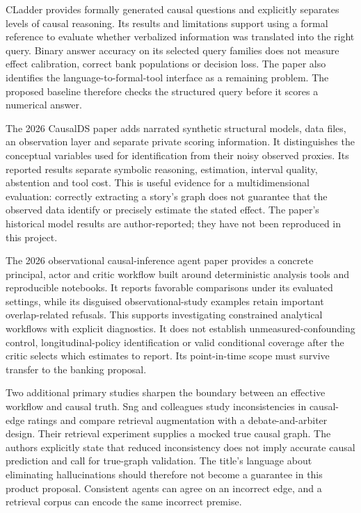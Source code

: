 CLadder provides formally generated causal questions and explicitly
separates levels of causal reasoning. Its results and limitations
support using a formal reference to evaluate whether verbalized
information was translated into the right query. Binary answer accuracy
on its selected query families does not measure effect calibration,
correct bank populations or decision loss. The paper also identifies the
language-to-formal-tool interface as a remaining problem. The proposed
baseline therefore checks the structured query before it scores a
numerical answer. \citep{v12_la_2312_04350}

The 2026 CausalDS paper adds narrated synthetic structural models, data
files, an observation layer and separate private scoring information. It
distinguishes the conceptual variables used for identification from
their noisy observed proxies. Its reported results separate symbolic
reasoning, estimation, interval quality, abstention and tool cost. This
is useful evidence for a multidimensional evaluation: correctly
extracting a story's graph does not guarantee that the observed data
identify or precisely estimate the stated effect. The paper's historical
model results are author-reported; they have not been reproduced in this
project. \citep{v12_la_2607_08093}

The 2026 observational causal-inference agent paper provides a concrete
principal, actor and critic workflow built around deterministic analysis
tools and reproducible notebooks. It reports favorable comparisons under
its evaluated settings, while its disguised observational-study examples
retain important overlap-related refusals. This supports investigating
constrained analytical workflows with explicit diagnostics. It does not
establish unmeasured-confounding control, longitudinal-policy
identification or valid conditional coverage after the critic selects
which estimates to report. Its point-in-time scope must survive transfer
to the banking proposal. \citep{v12_la_2607_22443}

Two additional primary studies sharpen the boundary between an effective
workflow and causal truth. Sng and colleagues study inconsistencies in
causal-edge ratings and compare retrieval augmentation with a
debate-and-arbiter design. Their retrieval experiment supplies a mocked
true causal graph. The authors explicitly state that reduced
inconsistency does not imply accurate causal prediction and call for
true-graph validation. The title's language about eliminating
hallucinations should therefore not become a guarantee in this product
proposal. Consistent agents can agree on an incorrect edge, and a
retrieval corpus can encode the same incorrect premise.
\citep{exec13_hallucination}

